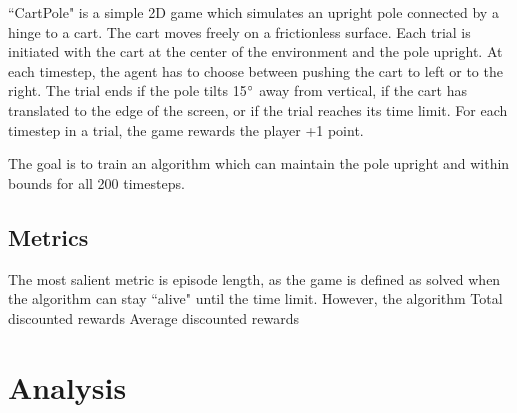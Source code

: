 \documentclass[12pt,a4paper]{article}
\begin{document}
``CartPole" is a simple 2D game which simulates an upright pole connected by a hinge to a cart.\cite{cartpole} The cart moves freely on a frictionless surface. Each trial is initiated with the cart at the center of the environment and the pole upright. At each timestep, the agent has to choose between pushing the cart to left or to the right. The trial ends if the pole tilts 15$\degree$ away from vertical, if the cart has translated to the edge of the screen, or if the trial reaches its time limit. For each timestep in a trial, the game rewards the player +1 point.

The goal is to train an algorithm which can maintain the pole upright and within bounds for all 200 timesteps.

\subsection*{Metrics}

The most salient metric is episode length, as the game is defined as solved when the algorithm can stay ``alive" until the time limit. However, the algorithm 
Total discounted rewards
Average discounted rewards
\section{Analysis}
%
\end{document}
